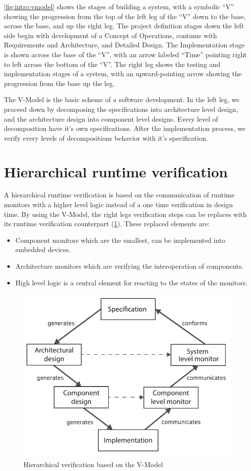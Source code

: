 \cref{fig:intro:vmodel} shows the stages of building a system, with a symbolic “V” showing the progression from the top of the left leg of the ``V'' down to the base, across the base, and up the right leg. The project definition stages down the left side begin with development of a Concept of Operations, continue with Requirements and Architecture, and Detailed Design. The Implementation stage is shown across the base of the ``V'', with an arrow labeled ``Time'' pointing right to left across the bottom of the ``V''. The right leg shows the testing and implementation stages of a system, with an upward-pointing arrow showing the progression from the base up the leg. \cite{vmodel}

The V-Model is the basic scheme of a software development. In the left leg, we proceed down by decomposing the specifications into architecture level design, and the architecture design into component level designs. Every level of decomposition have it's own specifications. After the implementation process, we verify every levels of decompositions behavior with it's specification.

\section*{Hierarchical runtime verification}

A hierarchical runtime verification is based on the communication of runtime monitors with a higher level logic instead of a one time verification in design time. By using the V-Model, the right legs verification steps can be replaces with its runtime verification counterpart (\cref{fig:intro:rvmodel}).
These replaced elements are:
\begin{itemize}
	\item Component monitors which are the smallest, can be implemented into embedded devices.
	\item Architecture monitors which are verifying the interoperation of components.
	\item High level logic is a central element for reacting to the states of the monitors.
\end{itemize}

\begin{figure}[h]
	\centering
	\includegraphics[width=0.8\linewidth]{include/figures/chapter_1/rv_vmodel}
	\caption{Hierarchical verification based on the V-Model}
	\label{fig:intro:rvmodel}
\end{figure}

